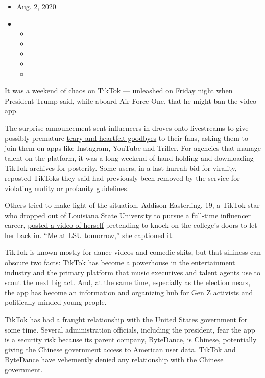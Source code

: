 \begin{itemize}
\item
  Aug. 2, 2020
\item
  \begin{itemize}
  \item
  \item
  \item
  \item
  \item
  \end{itemize}
\end{itemize}

It was a weekend of chaos on TikTok --- unleashed on Friday night when
President Trump said, while aboard Air Force One, that he might ban the
video app.

The surprise announcement sent influencers in droves onto livestreams to
give possibly premature
\href{https://twitter.com/iamaliceophelia/status/1289402462957273088}{teary
and heartfelt goodbyes} to their fans, asking them to join them on apps
like Instagram, YouTube and Triller. For agencies that manage talent on
the platform, it was a long weekend of hand-holding and downloading
TikTok archives for posterity. Some users, in a last-hurrah bid for
virality, reposted TikToks they said had previously been removed by the
service for violating nudity or profanity guidelines.

Others tried to make light of the situation. Addison Easterling, 19, a
TikTok star who dropped out of Louisiana State University to pursue a
full-time influencer career,
\href{https://vm.tiktok.com/J2T9X8K/}{posted a video of herself}
pretending to knock on the college's doors to let her back in. ``Me at
LSU tomorrow,'' she captioned it.

TikTok is known mostly for dance videos and comedic skits, but that
silliness can obscure two facts: TikTok has become a powerhouse in the
entertainment industry and the primary platform that music executives
and talent agents use to scout the next big act. And, at the same time,
especially as the election nears, the app has become an information and
organizing hub for Gen Z activists and politically-minded young people.

TikTok has had a fraught relationship with the United States government
for some time. Several administration officials, including the
president, fear the app is a security risk because its parent company,
ByteDance, is Chinese, potentially giving the Chinese government access
to American user data. TikTok and ByteDance have vehemently denied any
relationship with the Chinese government.

